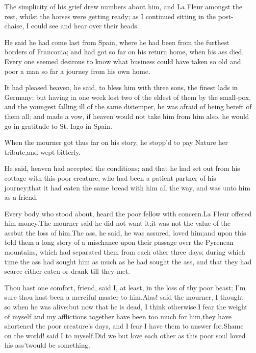 \documentclass[twoside]{article}
\begin{document}
The simplicity of his grief drew numbers about him, and La Fleur amongst
the rest, whilst the horses were getting ready; as I continued sitting in
the post-chaise, I could see and hear over their heads.

\tsk He said he had come last from Spain, where he had been from the furthest
borders of Franconia; and had got so far on his return home, when his ass
died.  Every one seemed desirous to know what business could have taken
so old and poor a man so far a journey from his own home.

It had pleased heaven, he said, to bless him with three sons, the finest
lads in Germany; but having in one week lost two of the eldest of them by
the small-pox, and the youngest falling ill of the same distemper, he was
afraid of being bereft of them all; and made a vow, if heaven would not
take him from him also, he would go in gratitude to St. Iago in Spain.

When the mourner got thus far on his story, he stopp’d to pay Nature her
tribute,\tsk and wept bitterly.

He said, heaven had accepted the conditions; and that he had set out from
his cottage with this poor creature, who had been a patient partner of
his journey;\tsk that it had eaten the same bread with him all the way, and
was unto him as a friend.

Every body who stood about, heard the poor fellow with concern.\tsk La Fleur
offered him money.\tsk The mourner said he did not want it;\tsk it was not the
value of the ass\tsk but the loss of him.\tsk The ass, he said, he was assured,
loved him;\tsk and upon this told them a long story of a mischance upon their
passage over the Pyrenean mountains, which had separated them from each
other three days; during which time the ass had sought him as much as he
had sought the ass, and that they had scarce either eaten or drank till
they met.

Thou hast one comfort, friend, said I, at least, in the loss of thy poor
beast; I’m sure thou hast been a merciful master to him.\tsk Alas! said the
mourner, I thought so when he was alive;\tsk but now that he is dead, I think
otherwise.\tsk I fear the weight of myself and my afflictions together have
been too much for him,\tsk they have shortened the poor creature’s days, and
I fear I have them to answer for.\tsk Shame on the world! said I to
myself.\tsk Did we but love each other as this poor soul loved his
ass\tsk ’twould be something.\tsk 
\end{document}
